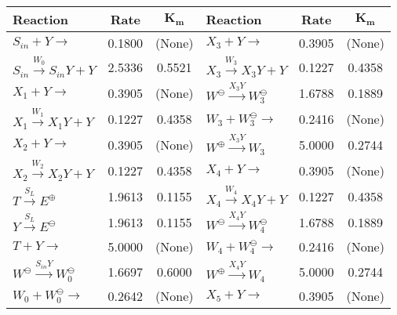 \begin{table}[ht]
\centering
\begin{tabular}{lcc||lcc}
\textbf{Reaction}                                 & \textbf{Rate} & $\boldsymbol{K_{m}}$ & \textbf{Reaction}                                       & \textbf{Rate} & $\boldsymbol{K_{m}}$\\ \hline
$S_{in} + Y \rightarrow$                          & 0.1800        & (None)               & $X_3 + Y \rightarrow$                                   & 0.3905        & (None) \\
$S_{in} \xrightarrow{W_0} S_{in}Y + Y$            & 2.5336        & 0.5521               & $X_3 \xrightarrow{W_3} X_3Y + Y$                        & 0.1227        & 0.4358 \\
$X_{1} + Y \rightarrow$                           & 0.3905        & (None)               & $W^{\ominus} \xrightarrow{X_3Y} W_3^{\ominus}$          & 1.6788        & 0.1889 \\
$X_{1} \xrightarrow{W_1} X_{1}Y + Y$              & 0.1227        & 0.4358               & $W_3 + W_3^{\ominus} \rightarrow$                       & 0.2416        & (None) \\
$X_{2} + Y \rightarrow$                           & 0.3905        & (None)               & $W^{\oplus} \xrightarrow{X_3Y} W_3$                     & 5.0000        & 0.2744 \\
$X_{2} \xrightarrow{W_2} X_{2}Y + Y$              & 0.1227        & 0.4358               & $X_4 + Y \rightarrow$                                   & 0.3905        & (None) \\
$T \xrightarrow{S_L} E^{\oplus}$                  & 1.9613        & 0.1155               & $X_4 \xrightarrow{W_4} X_4Y + Y$                        & 0.1227        & 0.4358 \\
$Y \xrightarrow{S_L} E^{\ominus}$                 & 1.9613        & 0.1155               & $W^{\ominus} \xrightarrow{X_4Y} W_4^{\ominus}$          & 1.6788        & 0.1889 \\
$T + Y \rightarrow$                               & 5.0000        & (None)               & $W_4 + W_4^{\ominus} \rightarrow$                       & 0.2416        & (None) \\
$W^{\ominus} \xrightarrow{S_{in}Y} W_0^{\ominus}$ & 1.6697        & 0.6000               & $W^{\oplus} \xrightarrow{X_4Y} W_4$                     & 5.0000        & 0.2744 \\
$W_0 + W_0^{\ominus} \rightarrow$                 & 0.2642        & (None)               & $X_5 + Y \rightarrow$                                   & 0.3905        & (None) \\

\end{tabular}
\end{table}
